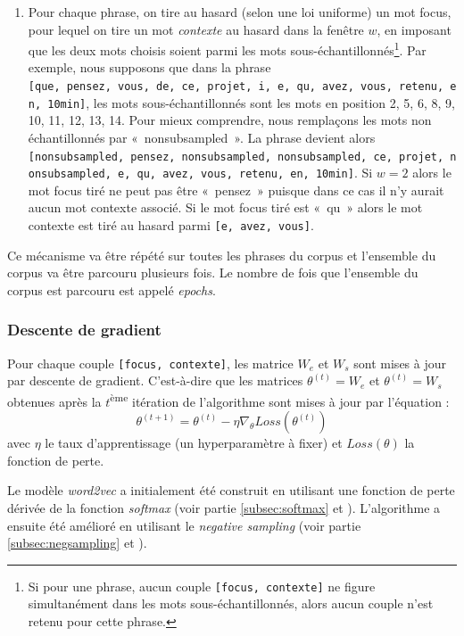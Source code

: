 \documentclass[11pt,french,french]{article}
\providecommand{\tightlist}{%
  \setlength{\parskip}{0pt}
  }
\let\rmarkdownfootnote\footnote%
\def\footnote{\protect\rmarkdownfootnote}
\begin{document}
\begin{enumerate}
\def\labelenumi{\arabic{enumi}.}
\setcounter{enumi}{1}
\tightlist
\item
  Pour chaque phrase, on tire au hasard (selon une loi uniforme) un mot
  focus, pour lequel on tire un mot \emph{contexte} au hasard dans la
  fenêtre \(w\), en imposant que les deux mots choisis soient parmi les
  mots sous-échantillonnés\footnote{Si pour une phrase, aucun couple
    \texttt{{[}focus,\ contexte{]}} ne figure simultanément dans les
    mots sous-échantillonnés, alors aucun couple n'est retenu pour cette
    phrase.}. Par exemple, nous supposons que dans la phrase
  \texttt{{[}que,\ pensez,\ vous,\ de,\ ce,\ projet,\ i,\ e,\ qu,\ avez,\ vous,\ retenu,\ en,\ 10min{]}},
  les mots sous-échantillonnés sont les mots en position 2, 5, 6, 8, 9,
  10, 11, 12, 13, 14. Pour mieux comprendre, nous remplaçons les mots
  non échantillonnés par «~nonsubsampled~». La phrase devient alors
  \texttt{{[}nonsubsampled,\ pensez,\ nonsubsampled,\ nonsubsampled,\ ce,\ projet,\ nonsubsampled,\ e,\ qu,\ avez,\ vous,\ retenu,\ en,\ 10min{]}}.
  Si \(w=2\) alors le mot focus tiré ne peut pas être «~pensez~» puisque
  dans ce cas il n'y aurait aucun mot contexte associé. Si le mot focus
  tiré est «~qu~» alors le mot contexte est tiré au hasard parmi
  \texttt{{[}e,\ avez,\ vous{]}}.
\end{enumerate}

Ce mécanisme va être répété sur toutes les phrases du corpus et
l'ensemble du corpus va être parcouru plusieurs fois. Le nombre de fois
que l'ensemble du corpus est parcouru est appelé \emph{epochs}.

\subsubsection{Descente de gradient}\label{subsec:descentedegradient}

Pour chaque couple \texttt{{[}focus,\ contexte{]}}, les matrice \(W_e\)
et \(W_s\) sont mises à jour par descente de gradient. C'est-à-dire que
les matrices \(\theta^{(t)} = W_e\) et \(\theta^{(t)} = W_s\) obtenues
après la \(t\)\textsuperscript{ème} itération de l'algorithme sont mises
à jour par l'équation : \[
\theta^{(t+1)} = \theta^{(t)} - \eta \nabla_\theta Loss(\theta^{(t)})
\] avec \(\eta\) le taux d'apprentissage (un hyperparamètre à fixer) et
\(Loss(\theta)\) la fonction de perte.

Le modèle \emph{word2vec} a initialement été construit en utilisant une
fonction de perte dérivée de la fonction \emph{softmax} (voir partie
\ref{subsec:softmax} et \cite{Mikolov}). L'algorithme a ensuite été
amélioré en utilisant le \emph{negative sampling} (voir partie
\ref{subsec:negsampling} et \cite{MikolovNS}).
\end{document}
